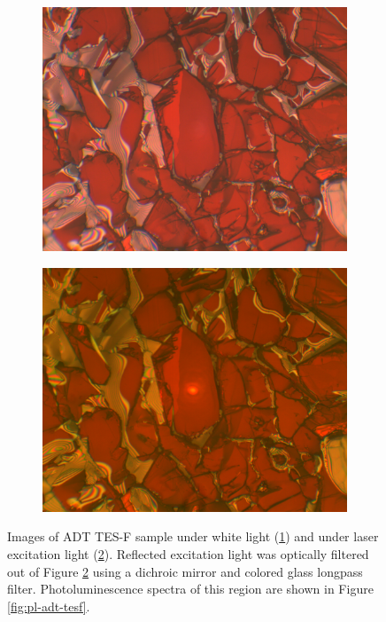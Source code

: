 \begin{figure}[H]
    \centering
    \begin{subfigure}[b]{0.45\textwidth}
        \includegraphics[width=\textwidth]{./img/tesf-white-illum.png}
        \caption{}
        \label{img:tesf-white}
    \end{subfigure}
    \hfill
    \begin{subfigure}[b]{0.45\textwidth}
        \includegraphics[width=\textwidth]{./img/tesf-laser-illum.png}
        \caption{}
        \label{img:tesf-laser}
    \end{subfigure}
    \caption[Images of ADT TES-F sample under white light and under laser excitation light.]{Images of ADT TES-F sample under white light (\ref{img:tesf-white}) and under laser excitation light (\ref{img:tesf-laser}). Reflected excitation light was optically filtered out of Figure \ref{img:tesf-laser} using a dichroic mirror and colored glass longpass filter. Photoluminescence spectra of this region are shown in Figure \ref{fig:pl-adt-tesf}.}
    \label{img:tesf}
\end{figure}

